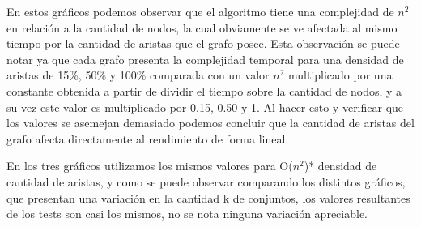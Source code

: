 En estos gráficos podemos observar que el algoritmo tiene una complejidad de $n^{2}$ en relación a la cantidad de nodos, la cual obviamente se ve afectada al mismo tiempo por la cantidad de aristas que el grafo posee. Esta observación se puede notar ya que cada grafo presenta la complejidad temporal para una densidad de aristas de 15\%, 50\% y 100\% comparada con un valor $n^{2}$ multiplicado por una constante obtenida a partir de dividir el tiempo sobre la cantidad de nodos, y a su vez este valor es multiplicado por 0.15, 0.50 y 1.
Al hacer esto y verificar que los valores se asemejan demasiado podemos concluir que la cantidad de aristas del grafo afecta directamente al rendimiento de forma lineal.

En los tres gráficos utilizamos los mismos valores para O($n^{2}$)* densidad de cantidad de aristas, y como se puede observar comparando los distintos gráficos, que presentan una variación en la cantidad k de conjuntos, los valores resultantes de los tests son casi los mismos, no se nota ninguna variación apreciable. 





